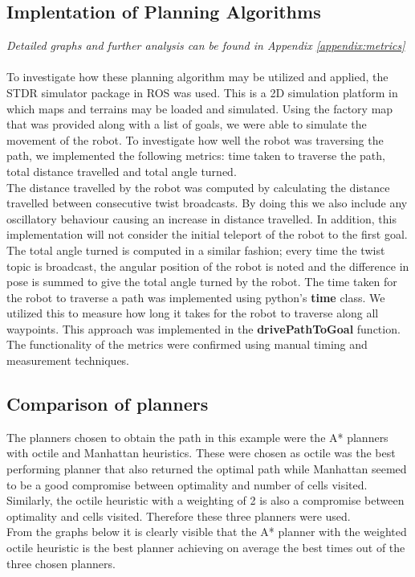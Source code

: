 \documentclass[a4paper,12pt]{article}
\begin{document}
		\subsection{Implentation of Planning Algorithms}
		\textit{Detailed graphs and further analysis can be found in Appendix \ref{appendix:metrics}} 
			\\
			\\
			To investigate how these planning algorithm may be utilized and applied, the STDR simulator package in ROS was used. This is a 2D simulation platform in which maps and terrains may be loaded and simulated. Using the factory map that was provided along with a list of goals, we were able to simulate the movement of the robot. To investigate how well the robot was traversing the path, we implemented the following metrics: time taken to traverse the path, total distance travelled and total angle turned. 
			\\
			The distance travelled by the robot was computed by calculating the distance travelled between consecutive twist broadcasts. By doing this we also include any oscillatory behaviour causing an increase in distance travelled. In addition, this implementation will not consider the initial teleport of the robot to the first goal. The total angle turned is computed in a similar fashion; every time the twist topic is broadcast, the angular position of the robot is noted and the difference in pose is summed to give the total angle turned by the robot. The time taken for the robot to traverse a path was implemented using python's \textbf{time} class. We utilized this to measure how long it takes for the robot to traverse along all waypoints. This approach was implemented in the \textbf{drivePathToGoal} function. The functionality of the metrics were confirmed using manual timing and measurement techniques. 
						
		\subsection{Comparison of planners}
			The planners chosen to obtain the path in this example were the A* planners with octile and Manhattan heuristics. These were chosen as octile was the best performing planner that also returned the optimal path while Manhattan seemed to be a good compromise between optimality and number of cells visited. Similarly, the octile heuristic with a weighting of 2 is also a compromise between optimality and cells visited. Therefore these three planners were used. 
			\\
			From the graphs below it is clearly visible that the A* planner with the weighted octile heuristic is the best planner achieving on average the best times out of the three chosen planners. 
			
\end{document}
